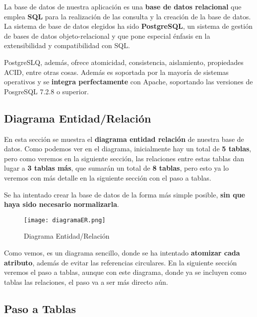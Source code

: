 La base de datos de nuestra aplicación es una \textbf{base de datos relacional} que emplea \textbf{SQL} para la realización de las consulta y la creación de la base de datos. La sistema de base de datos elegidos ha sido \textbf{PostgreSQL}, un sistema de gestión de bases de datos objeto-relacional y que pone especial énfasis en la extensibilidad y compatibilidad con SQL. \cite{wiki02}

PostgreSLQ, además, ofrece atomicidad, consistencia, aislamiento, propiedades \gls{ACID}, entre otras cosas. Además es soportada por la mayoría de sistemas operativos y se \textbf{integra perfectamente} con Apache, soportando las versiones de PosgreSQL 7.2.8 o superior. \cite{apache01}

\subsection{Diagrama Entidad/Relación}
En esta sección se muestra el \textbf{diagrama entidad relación} de nuestra base de datos. Como podemos ver en el diagrama, inicialmente hay un total de \textbf{5 tablas}, pero como veremos en la siguiente sección, las relaciones entre estas tablas dan lugar a \textbf{3 tablas más}, que sumarán un total de \textbf{8 tablas}, pero esto ya lo veremos con más detalle en la siguiente sección con el paso a tablas.

Se ha intentado crear la base de datos de la forma más simple posible, \textbf{sin que haya sido necesario normalizarla}.

\begin{figure}[H]
	\centering
	\texttt{[image: diagramaER.png]}
	\caption{Diagrama Entidad/Relación}
\end{figure}

Como vemos, es un diagrama sencillo, donde se ha intentado \textbf{atomizar cada atributo}, además de evitar las referencias circulares. En la siguiente sección veremos el paso a tablas, aunque con este diagrama, donde ya se incluyen como tablas las relaciones, el paso va a ser más directo aún.

\subsection{Paso a Tablas}





\newpage

\appendix


